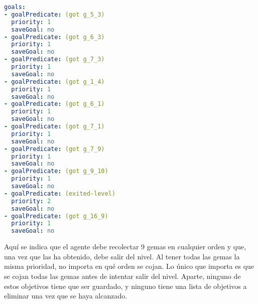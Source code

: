 \begin{enumerate}
    \begin{lstlisting}[language=yaml]
goals:
- goalPredicate: (got g_5_3)
  priority: 1
  saveGoal: no
- goalPredicate: (got g_6_3)
  priority: 1
  saveGoal: no
- goalPredicate: (got g_7_3)
  priority: 1
  saveGoal: no
- goalPredicate: (got g_1_4)
  priority: 1
  saveGoal: no
- goalPredicate: (got g_6_1)
  priority: 1
  saveGoal: no
- goalPredicate: (got g_7_1)
  priority: 1
  saveGoal: no
- goalPredicate: (got g_7_9)
  priority: 1
  saveGoal: no
- goalPredicate: (got g_9_10)
  priority: 1
  saveGoal: no
- goalPredicate: (exited-level)
  priority: 2
  saveGoal: no
- goalPredicate: (got g_16_9)
  priority: 1
  saveGoal: no
    \end{lstlisting}
    
    Aquí se indica que el agente debe recolectar 9 gemas en cualquier orden y que, una vez que las ha obtenido,
    debe salir del nivel. Al tener todas las gemas la misma prioridad, no importa en qué orden se cojan.
    Lo único que importa es que se cojan todas las gemas antes de intentar salir del nivel. Aparte,
    ninguno de estos objetivos tiene que ser guardado, y ninguno tiene una lista de objetivos a
    eliminar una vez que se haya alcanzado.
\end{enumerate}